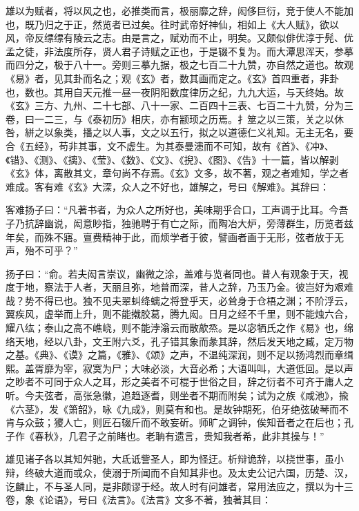 \documentclass[]{article}
\begin{document}
雄以为赋者，将以风之也，必推类而言，极丽靡之辞，闳侈巨衍，竞于使人不能加也，既乃归之于正，然览者已过矣。往时武帝好神仙，相如上《大人赋》，欲以风，帝反缥缥有陵云之志。由是言之，赋劝而不止，明矣。又颇似俳优淳于髡、优孟之徒，非法度所存，贤人君子诗赋之正也，于是辍不复为。而大潭思浑天，参摹而四分之，极于八十一。旁则三摹九据，极之七百二十九赞，亦自然之道也。故观《易》者，见其卦而名之；观《玄》者，数其画而定之。《玄》首四重者，非卦也，数也。其用自天元推一昼一夜阴阳数度律历之纪，九九大运，与天终始。故《玄》三方、九州、二十七部、八十一家、二百四十三表、七百二十九赞，分为三卷，曰一二三，与《泰初历》相庆，亦有颛顼之历焉。扌筮之以三策，关之以休咎，絣之以象类，播之以人事，文之以五行，拟之以道德仁义礼知。无主无名，要合《五经》，苟非其事，文不虚生。为其泰曼漶而不可知，故有《首》、《冲》、《错》、《测》、《摛》、《莹》、《数》、《文》、《掜》、《图》、《告》十一篇，皆以解剥《玄》体，离散其文，章句尚不存焉。《玄》文多，故不著，观之者难知，学之者难成。客有难《玄》大深，众人之不好也，雄解之，号曰《解难》。其辞曰：

客难扬子曰：``凡著书者，为众人之所好也，美味期乎合口，工声调于比耳。今吾子乃抗辞幽说，闳意眇指，独驰聘于有亡之际，而陶冶大炉，旁薄群生，历览者兹年矣，而殊不寤。亶费精神于此，而烦学者于彼，譬画者画于无形，弦者放于无声，殆不可乎？''

扬子曰：``俞。若夫闳言崇议，幽微之涂，盖难与览者同也。昔人有观象于天，视度于地，察法于人者，天丽且弥，地普而深，昔人之辞，乃玉乃金。彼岂好为艰难哉？势不得已也。独不见夫翠虯绛螭之将登乎天，必耸身于仓梧之渊；不阶浮云，翼疾风，虚举而上升，则不能撠胶葛，腾九闳。日月之经不千里，则不能烛六合，耀八纮；泰山之高不嶕峣，则不能浡滃云而散歊烝。是以宓牺氏之作《易》也，绵络天地，经以八卦，文王附六爻，孔子错其象而彖其辞，然后发天地之臧，定万物之基。《典》、《谟》之篇，《雅》、《颂》之声，不温纯深润，则不足以扬鸿烈而章缉熙。盖胥靡为宰，寂寞为尸；大味必淡，大音必希；大语叫叫，大道低回。是以声之眇者不可同于众人之耳，形之美者不可棍于世俗之目，辞之衍者不可齐于庸人之听。今夫弦者，高张急徽，追趋逐耆，则坐者不期而附矣；试为之族《咸池》，揄《六茎》，发《箫韶》，咏《九成》，则莫有和也。是故钟期死，伯牙绝弦破琴而不肯与众鼓；獿人亡，则匠石辍斤而不敢妄斫。师旷之调钟，俟知音者之在后也；孔子作《春秋》，几君子之前睹也。老聃有遗言，贵知我者希，此非其操与！''

雄见诸子各以其知舛驰，大氐诋訾圣人，即为怪迂。析辩诡辞，以挠世事，虽小辩，终破大道而或众，使溺于所闻而不自知其非也。及太史公记六国，历楚、汉，讫麟止，不与圣人同，是非颇谬于经。故人时有问雄者，常用法应之，撰以为十三卷，象《论语》，号曰《法言》。《法言》文多不著，独著其目：
\end{document}
